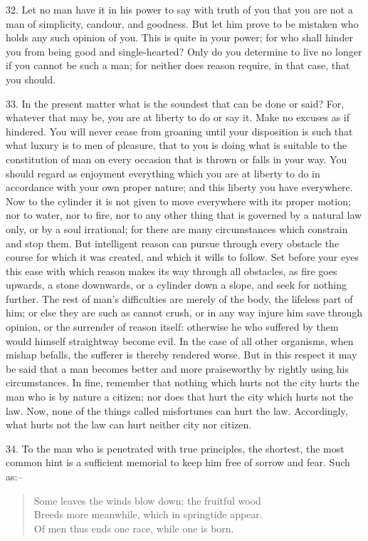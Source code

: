 \documentclass{book}
\begin{document}
32. Let no man have it in his power to say with truth of you that you
are not a man of simplicity, candour, and goodness. But let him prove
to be mistaken who holds any such opinion of you. This is quite in
your power; for who shall hinder you from being good and
single-hearted?  Only do you determine to live no longer if you cannot
be such a man; for neither does reason require, in that case, that you
should.

33. In the present matter what is the soundest that can be done or
said?  For, whatever that may be, you are at liberty to do or say
it. Make no excuses as if hindered. You will never cease from groaning
until your disposition is such that what luxury is to men of pleasure,
that to you is doing what is suitable to the constitution of man on
every occasion that is thrown or falls in your way. You should regard
as enjoyment everything which you are at liberty to do in accordance
with your own proper nature; and this liberty you have everywhere. Now
to the cylinder it is not given to move everywhere with its proper
motion; nor to water, nor to fire, nor to any other thing that is
governed by a natural law only, or by a soul irrational; for there are
many circumstances which constrain and stop them. But intelligent
reason can pursue through every obstacle the course for which it was
created, and which it wills to follow. Set before your eyes this ease
with which reason makes its way through all obstacles, as fire goes
upwards, a stone downwards, or a cylinder down a slope, and seek for
nothing further. The rest of man's difficulties are merely of the
body, the lifeless part of him; or else they are such as cannot crush,
or in any way injure him save through opinion, or the surrender of
reason itself: otherwise he who suffered by them would himself
straightway become evil. In the case of all other organisms, when
mishap befalls, the sufferer is thereby rendered worse. But in this
respect it may be said that a man becomes better and more praiseworthy
by rightly using his circumstances. In fine, remember that nothing
which hurts not the city hurts the man who is by nature a citizen; nor
does that hurt the city which hurts not the law. Now, none of the
things called misfortunes can hurt the law. Accordingly, what hurts
not the law can hurt neither city nor citizen.

34. To the man who is penetrated with true principles, the shortest, the
most common hint is a sufficient memorial to keep him free of sorrow
and fear. Such as:--

\begin{quote}
      Some leaves the winds blow down: the fruitful wood \\
      Breeds more meanwhile, which in springtide appear. \\
      Of men thus ends one race, while one is born.
\end{quote}
\end{document}
